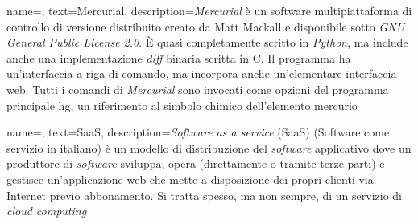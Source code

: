 {
    name=,
    text=Mercurial,
    description={\emph{Mercurial} è un software multipiattaforma di controllo di versione distribuito creato da Matt Mackall e disponibile sotto \emph{GNU General Public License 2.0}.
È quasi completamente scritto in \emph{Python}, ma include anche una implementazione \emph{diff} binaria scritta in C. Il programma ha un'interfaccia a riga di comando, ma incorpora anche un'elementare interfaccia web. 
Tutti i comandi di \emph{Mercurial} sono invocati come opzioni del programma principale hg, un riferimento al simbolo chimico dell'elemento mercurio}
}

{
    name=,
    text=SaaS,
    description={\emph{Software as a service} (SaaS) (Software come servizio in italiano) è un modello di distribuzione del \emph{software} applicativo dove un produttore di \emph{software} sviluppa, opera (direttamente o tramite terze parti) e gestisce un'applicazione web che mette a disposizione dei propri clienti via Internet previo abbonamento. Si tratta spesso, ma non sempre, di un servizio di \emph{cloud computing}}
}